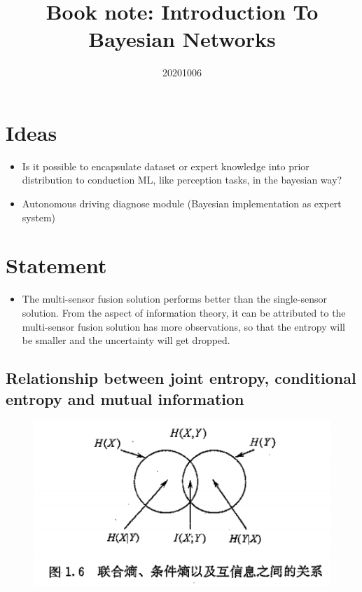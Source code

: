 \documentclass{article}
\title{Book note: Introduction To Bayesian Networks}
\date{20201006}
\begin{document}
\maketitle

\section{Ideas}

\begin{itemize}
    \item Is it possible to encapsulate dataset or expert knowledge into prior distribution
    to conduction ML, like perception tasks, in the bayesian way?
    \item Autonomous driving diagnose module (Bayesian implementation as expert system)
\end{itemize}

\section{Statement}

\begin{itemize}
    \item The multi-sensor fusion solution performs better than the single-sensor solution.
    From the aspect of information theory, it can be attributed to 
    the multi-sensor fusion solution has more observations, so that the entropy will be smaller and the uncertainty will get dropped.
\end{itemize}

\subsection{Relationship between joint entropy, conditional entropy and mutual information}
\begin{figure}[h]
\centering
\includegraphics[width=0.6\columnwidth]{figs/relationship_entropy_mutualinfo.png}
\end{figure}
\end{document}
